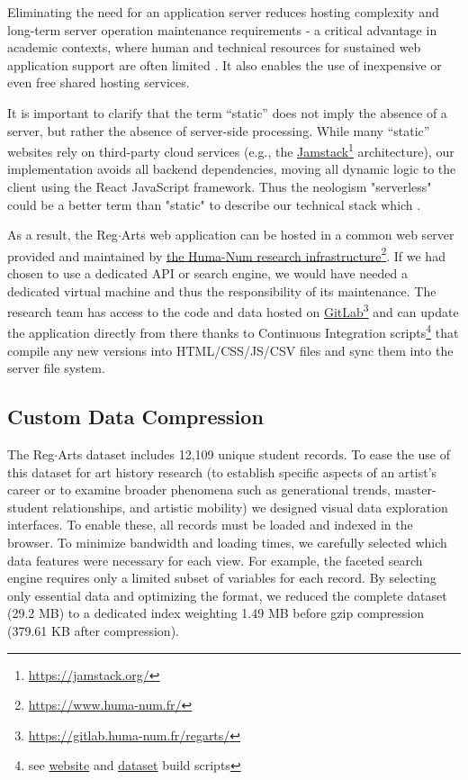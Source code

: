 \documentclass[final]{anthology-ch} %
\begin{document}
Eliminating the need for an application server reduces hosting complexity and long-term server operation maintenance requirements - a critical advantage in academic contexts, where human and technical resources for sustained web application support are often limited \cite{wikle_static_2025}. It also enables the use of inexpensive or even free shared hosting services.  

It is important to clarify that the term “static” does not imply the absence of a server, but rather the absence of server-side processing. While many “static” websites rely on third-party cloud services (e.g., the \href{https://jamstack.org/}{Jamstack}\footnote{\url{https://jamstack.org/}} architecture), our implementation avoids all backend dependencies, moving all dynamic logic to the client using the React JavaScript framework. Thus the neologism "serverless" could be a better term than "static" to describe our technical stack which .

As a result, the Reg$\cdot$Arts web application can be hosted in a common web server provided and maintained by \href{https://www.huma-num.fr/}{the Huma-Num research infrastructure}\footnote{\url{https://www.huma-num.fr/}}. If we had chosen to use a dedicated API or search engine, we would have needed a dedicated virtual machine and thus the responsibility of its maintenance. The research team has access to the code and data hosted on \href{https://gitlab.huma-num.fr/regarts/}{GitLab}\footnote{\url{https://gitlab.huma-num.fr/regarts/}} and can update the application directly from there thanks to Continuous Integration scripts\footnote{see \href{https://gitlab.huma-num.fr/regarts/website/-/blob/main/.gitlab-ci.yml}{website} and \href{https://gitlab.huma-num.fr/regarts/corpus/-/blob/main/.gitlab-ci.yml}{dataset} build scripts} that compile any new versions into HTML/CSS/JS/CSV files and sync them into the server file system. 

\subsection{Custom Data Compression}
The Reg$\cdot$Arts dataset includes 12,109 unique student records. To ease the use of this dataset for art history research (to establish specific aspects of an artist’s career or to examine broader phenomena such as generational trends, master-student relationships, and artistic mobility) we designed visual data exploration interfaces. To enable these, all records must be loaded and indexed in the browser. To minimize bandwidth and loading times, we carefully selected which data features were necessary for each view. For example, the faceted search engine requires only a limited subset of variables for each record. By selecting only essential data and optimizing the format, we reduced the complete dataset (29.2 MB) to a dedicated index weighting 1.49 MB before gzip compression (379.61 KB after compression).
\end{document}
